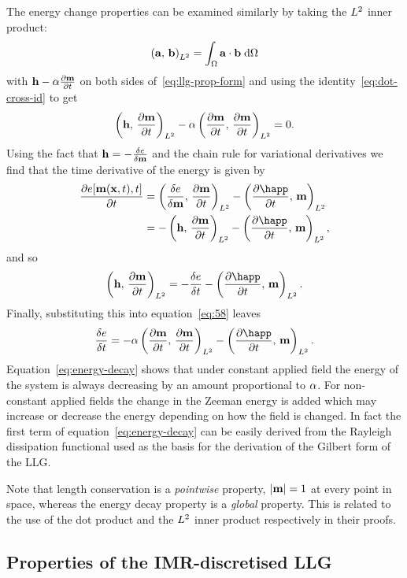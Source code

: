 The energy change properties can be examined similarly by taking the $L^2$ inner product:
\begin{equation}
  \left({\mathbf{a}},\, {\mathbf{b}} \right)_{L^2} = \int_\Omega {\mathbf{a}} \cdot {\mathbf{b}} {\; \text{d}}\Omega
\end{equation}
with $\mathbf{h} - \alpha \frac{\partial \mathbf{m}}{\partial t}$ on both sides of~\eqref{eq:llg-prop-form} and using the identity~\eqref{eq:dot-cross-id} to get
\begin{equation}
  \label{eq:58}
  \left(\mathbf{h},\, \frac{\partial \mathbf{m}}{\partial t} \right)_{L^2} - \alpha \left(\frac{\partial \mathbf{m}}{\partial t},\, \frac{\partial \mathbf{m}}{\partial t} \right)_{L^2} = 0.
\end{equation}
Using the fact that $\mathbf{h} = -\frac{\delta e}{\delta \mathbf{m}}$ and the chain rule for variational derivatives\cite{??ds} we find that the time derivative of the energy is given by
\begin{align*}
  \pd{\e[\mv(\xv, t), t]}{t} &= \ltip{\vd{e}{\mv}}{\dmdt} - \ltip{\pd{\happ}{t}}{\mv} \\
             &= -\ltip{\hv}{\dmdt} - \ltip{\pd{\happ}{t}}{\mv},
\end{align*}
and so
\begin{equation}
  \ltip{\hv}{\dmdt} = -\vd{\e}{t} - \ltip{\pd{\happ}{t}}{\mv}.
\end{equation}
Finally, substituting this into equation~\eqref{eq:58} leaves
\begin{equation}
  \label{eq:energy-decay}
  \vd{\e}{t} = -\dampc \ltip{\dmdt}{\dmdt} - \ltip{\pd{\happ}{t}}{\mv}.
\end{equation}
Equation~\eqref{eq:energy-decay} shows that under constant applied field the energy of the system is always decreasing by an amount proportional to $\alpha$.
For non-constant applied fields the change in the Zeeman energy is added which may increase or decrease the energy depending on how the field is changed. %
In fact the first term of equation~\eqref{eq:energy-decay} can be easily derived from the Rayleigh dissipation functional used as the basis for the derivation of the Gilbert form of the LLG.\cite{Gilbert2004}

Note that length conservation is a \emph{pointwise} property, \ie $\lvert \mathbf{m} \rvert = 1$ at every point in space, whereas the energy decay property is a \emph{global} property.
This is related to the use of the dot product and the $L^2$ inner product respectively in their proofs.


\subsection{Properties of the IMR-discretised LLG}
\label{sec:prop-imr-llg}

